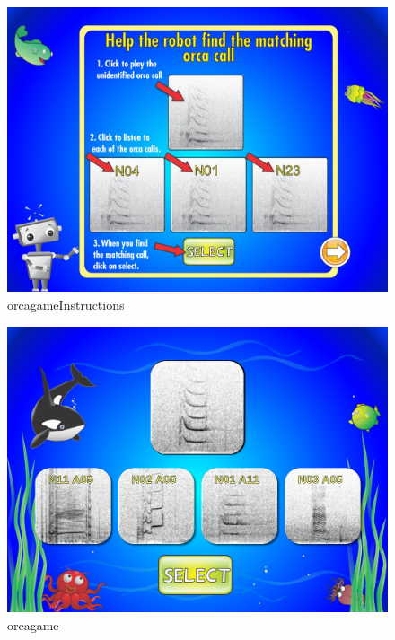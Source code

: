 \documentclass[12pt,oneside]{book}
\begin{document}

\begin{figure}[h]
\centering
\includegraphics[width=\columnwidth]{figures/orcagameInstructions}
\caption{orcagameInstructions}
\label{fig:orcagameInstructions}
\end{figure}


\begin{figure}[h]
\centering
\includegraphics[width=\columnwidth]{figures/orcagame}
\caption{orcagame}
\label{fig:orcagame}
\end{figure}
\end{document}
